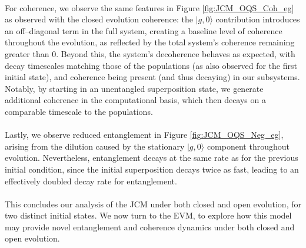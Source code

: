 \documentclass[11pt]{article}
\begin{document}
\noindent
\\
For coherence, we observe the same features in Figure \ref{fig:JCM_OQS_Coh_eg} as observed with the closed evolution coherence: the $|g,0\rangle$ contribution introduces an off--diagonal term in the full system, creating a baseline level of coherence throughout the evolution, as reflected by the total system's coherence remaining greater than 0. Beyond this, the system's decoherence behaves as expected, with decay timescales matching those of the populations (as also observed for the first initial state), and coherence being present (and thus decaying) in our subsystems. Notably, by starting in an unentangled superposition state, we generate additional coherence in the computational basis, which then decays on a comparable timescale to the populations.\\
\\
Lastly, we observe reduced entanglement in Figure \ref{fig:JCM_OQS_Neg_eg}, arising from the dilution caused by the stationary $|g,0\rangle$ component throughout evolution. Nevertheless, entanglement decays at the same rate as for the previous initial condition, since the initial superposition decays twice as fast, leading to an effectively doubled decay rate for entanglement.\\
\\
This concludes our analysis of the JCM under both closed and open evolution, for two distinct initial states. We now turn to the EVM, to explore how this model may provide novel entanglement and coherence dynamics under both closed and open evolution. 
\end{document}
